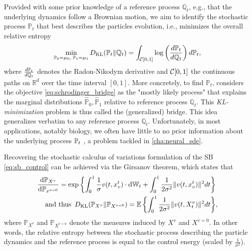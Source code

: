 Provided with some prior knowledge of a reference process $\mathbb{Q}_t$, e.g., that the underlying dynamics follow a Brownian motion, we aim to identify the stochastic process $\mathbb{P}_t$ that best describes the particles evolution, i.e., minimizes the overall relative entropy
\begin{equation}
	\label{eq:schrodinger_bridge}
	\min_{ \substack{ \mathbb{P}_{{0}} = \mu_0, \; \mathbb{P}_{{1}} = \mu_1} } D_{\mathrm{KL}}(\mathbb{P}_{{t}} \| \mathbb{Q}_{ t }) = \int_{{\mathcal{C}}[0,1]} \log \left( \frac{d\mathbb{P}_{{t}}}{d \mathbb{Q}_{ t }} \right) d\mathbb{P}_{{t}},
\end{equation}
where $\frac{d\mathbb{P}_{{t}}}{d\mathbb{Q}_{ t }}$ denotes the Radon-Nikodym derivative and ${\mathcal{C}}[0,1]$ the continuous paths on $\mathbb{R}^d$ over the time interval $[0, 1]$.
More concretely, to find $\mathbb{P}_t$, \citet{schrodinger1931umkehrung, schrodinger1932theorie} considers the objective \eqref{eq:schrodinger_bridge} as the "mostly likely process" that explains the marginal distributions $\hat{\mathbb{P}}_0, \hat{\mathbb{P}}_1$ relative to reference process $\mathbb{Q}_t$.
This \emph{KL-minimization} problem is thus called the (generalized) \citeauthor{schrodinger1931umkehrung} bridge.
This idea generalizes verbatim to any reference process $\mathbb{Q}_t$. Unfortunately, in most applications, notably biology, we often have little to no prior information about the underlying process $\mathbb{P}_{{t}}$ \citep{liberali2014hierarchical}, a problem tackled in \cref{cha:neural_sde}.

Recovering the stochastic calculus of variations formulation of the \acrlong{SB} \eqref{eq:sb_control} can be achieved via the Girsanov theorem, which states that
\begin{align*}
	\frac{\mathrm{d}\mathbb{P}_{X^v}}{\mathrm{d} \mathbb{P}_{x^{v=0}}} = \exp \left\{ \int_0^1 \frac{1}{\sigma} v(t, x_v^t) \cdot \mathrm{d} \mathbb{W}_t +  \int_0^1 \frac{1}{2\sigma^2} \lVert v(t, x_v^t)\rVert^2 dt \right\}& \\
	\text{and thus} \enspace D_{\mathrm{KL}}(\mathbb{P}_{X^v} \| \mathbb{P}_{X^{v=0}}) = \mathbb{E} \left\{ \int_0^1 \frac{1}{2\sigma^2}\lVert v(t, X^v_t)\rVert^2 dt \right\}& ,
\end{align*}
where $\mathbb{P}_{X^v}$ and $\mathbb{P}_{X^{v=0}}$ denote the measures induced by $X^v$ and $X^{v=0}$.
In other words, the relative entropy between the stochastic process describing the particle dynamics and the reference process is equal to the control energy (scaled by $\frac{1}{\sigma^2}$).

